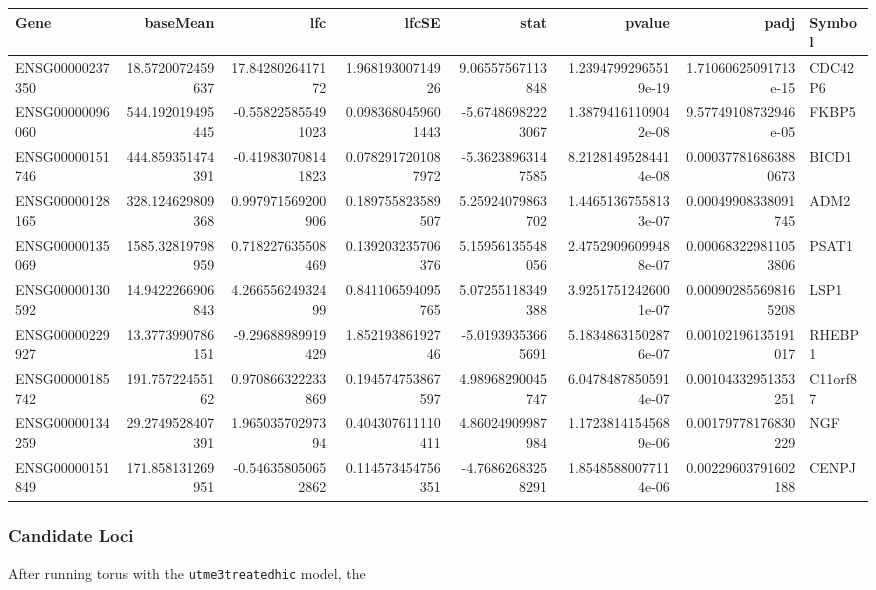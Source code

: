 \begin{center}
\begin{tabular}{lrrrrrrl}
Gene & baseMean & lfc & lfcSE & stat & pvalue & padj & Symbol\\
\hline
ENSG00000237350 & 18.5720072459637 & 17.8428026417172 & 1.96819300714926 & 9.06557567113848 & 1.23947992965519e-19 & 1.71060625091713e-15 & CDC42P6\\
ENSG00000096060 & 544.192019495445 & -0.558225855491023 & 0.0983680459601443 & -5.67486982223067 & 1.38794161109042e-08 & 9.57749108732946e-05 & FKBP5\\
ENSG00000151746 & 444.859351474391 & -0.419830708141823 & 0.0782917201087972 & -5.36238963147585 & 8.21281495284414e-08 & 0.000377816863880673 & BICD1\\
ENSG00000128165 & 328.124629809368 & 0.997971569200906 & 0.189755823589507 & 5.25924079863702 & 1.44651367558133e-07 & 0.00049908338091745 & ADM2\\
ENSG00000135069 & 1585.32819798959 & 0.718227635508469 & 0.139203235706376 & 5.15956135548056 & 2.47529096099488e-07 & 0.000683229811053806 & PSAT1\\
ENSG00000130592 & 14.9422266906843 & 4.26655624932499 & 0.841106594095765 & 5.07255118349388 & 3.92517512426001e-07 & 0.000902855698165208 & LSP1\\
ENSG00000229927 & 13.3773990786151 & -9.29688989919429 & 1.85219386192746 & -5.01939353665691 & 5.18348631502876e-07 & 0.00102196135191017 & RHEBP1\\
ENSG00000185742 & 191.75722455162 & 0.970866322233869 & 0.194574753867597 & 4.98968290045747 & 6.04784878505914e-07 & 0.00104332951353251 & C11orf87\\
ENSG00000134259 & 29.2749528407391 & 1.96503570297394 & 0.404307611110411 & 4.86024909987984 & 1.17238141545689e-06 & 0.00179778176830229 & NGF\\
ENSG00000151849 & 171.858131269951 & -0.546358050652862 & 0.114573454756351 & -4.76862683258291 & 1.85485880077114e-06 & 0.00229603791602188 & CENPJ\\
\end{tabular}
\end{center}




\subsubsection{Candidate Loci}\label{sec:org91a5cf4}


After running torus with the \texttt{utme3treatedhic} model, the 

